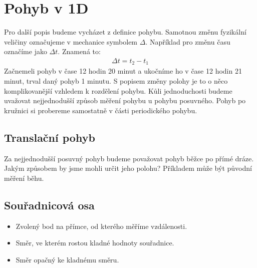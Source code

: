 \documentclass[letterpaper,10pt,english]{jupyterBook}
\begin{document}
\section{Pohyb v 1D}
\label{\detokenize{Prednasky/1_2_Kinematika_v_1D:pohyb-v-1d}}
\sphinxAtStartPar
Pro další popis budeme vycházet z definice pohybu. Samotnou změnu fyzikální veličiny označujeme v mechanice symbolem \(\Delta\). Například pro změnu času označíme jako \(\Delta t\). Znamená to:
\begin{equation*}
\begin{split}\Delta t = t_2 - t_1\end{split}
\end{equation*}
\sphinxAtStartPar
Začneme\sphinxhyphen{}li pohyb v čase 12 hodin 20 minut a ukočníme ho v čase 12 hodin 21 minut, trval daný pohyb 1 minutu. S popisem změny polohy je to o něco komplikovanější vzhledem k rozdělení pohybu. Kůli jednoduchosti budeme uvažovat nejjednodušší způsob měření pohybu u pohybu posuvného. Pohyb po kružnici si probereme samostatně v části periodického pohybu.


\subsection{Translační pohyb}
\label{\detokenize{Prednasky/1_2_Kinematika_v_1D:translacni-pohyb}}
\sphinxAtStartPar
Za nejjednodušší posuvný pohyb budeme považovat pohyb běžce po přímé dráze. Jakým způsobem by jsme mohli určit jeho polohu? Příkladem může být původní měření běhu.

\sphinxAtStartPar
{}


\subsection{Souřadnicová osa}
\label{\detokenize{Prednasky/1_2_Kinematika_v_1D:souradnicova-osa}}\begin{itemize}
\item {} 
\sphinxAtStartPar
{} Zvolený bod na přímce, od kterého měříme vzdálenosti.

\item {} 
\sphinxAtStartPar
{} Směr, ve kterém rostou kladné hodnoty souřadnice.

\item {} 
\sphinxAtStartPar
{} Směr opačný ke kladnému směru.

\end{itemize}
\end{document}

